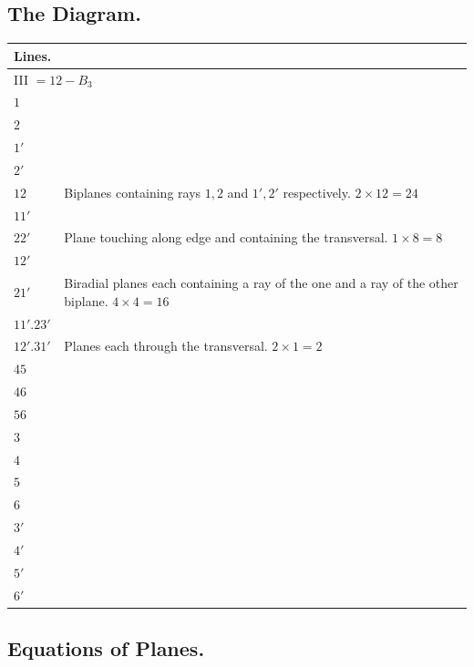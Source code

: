 \documentclass[11pt,a4paper]{article}
\begin{document}
\subsection*{The Diagram.}

\begin{center}
\begin{tabular}{ll}
\textbf{Lines.} & \\
\midrule
\multicolumn{2}{l}{III $= 12 - B_3$} \\
$1$ & \\
$2$ & \\
$1'$ & \\
$2'$ & \\
$12$ & Biplanes containing rays $1, 2$ and $1', 2'$ respectively. $2 \times 12 = 24$ \\
$11'$ & \\
$22'$ & Plane touching along edge and containing the transversal. $1 \times 8 = 8$ \\
$12'$ & \\
$21'$ & Biradial planes each containing a ray of the one and a ray of the other biplane. $4 \times 4 = 16$ \\
$11'.23'$ & \\
$12'.31'$ & Planes each through the transversal. $2 \times 1 = 2$ \\
$45$ & \\
$46$ & \\
$56$ & \\
$3$ & \\
$4$ & \\
$5$ & \\
$6$ & \\
$3'$ & \\
$4'$ & \\
$5'$ & \\
$6'$ &
\end{tabular}
\end{center}

\subsection*{Equations of Planes.}
\end{document}
